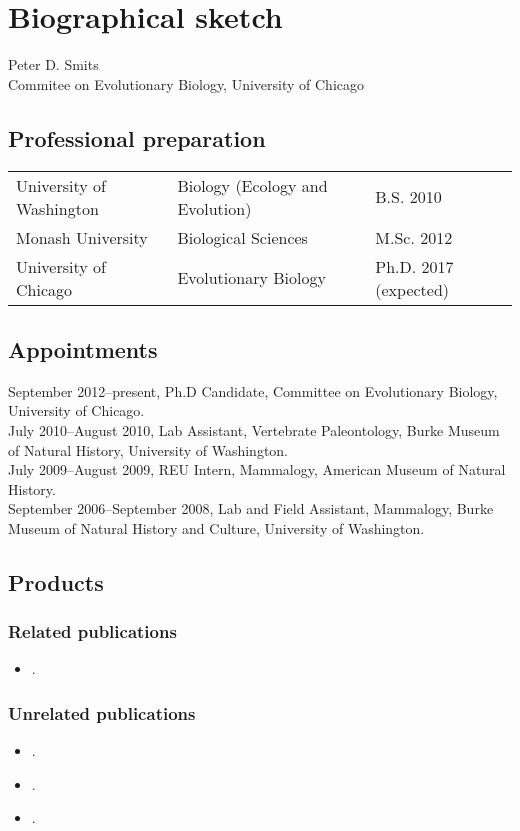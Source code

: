 \documentclass[11pt,letterpaper]{article}
\begin{document}
\setcounter{secnumdepth}{0}
\section{Biographical sketch}

Peter D. Smits\\Commitee on Evolutionary Biology, University of Chicago

\subsection{Professional preparation}
\begin{tabular}[H]{l l l}
University of Washington & Biology (Ecology and Evolution) & B.S. 2010\\
Monash University & Biological Sciences & M.Sc. 2012\\
University of Chicago & Evolutionary Biology & Ph.D. 2017 (expected)
\end{tabular}

\subsection{Appointments}
September 2012--present, Ph.D Candidate, Committee on Evolutionary Biology, University of Chicago.\\
July 2010--August 2010, Lab Assistant, Vertebrate Paleontology, Burke Museum of Natural History, University of Washington.\\
July 2009--August 2009, REU Intern, Mammalogy, American Museum of Natural History.\\
September 2006--September 2008, Lab and Field Assistant, Mammalogy, Burke Museum of Natural History and Culture, University of Washington.

\subsection{Products}
\subsubsection{Related publications}
\begin{itemize}
  \item {}.  %
\end{itemize}

\subsubsection{Unrelated publications}
\begin{itemize}
  \item {}. %
  \item {}. %
  \item {}.%
\end{itemize}
\end{document}

